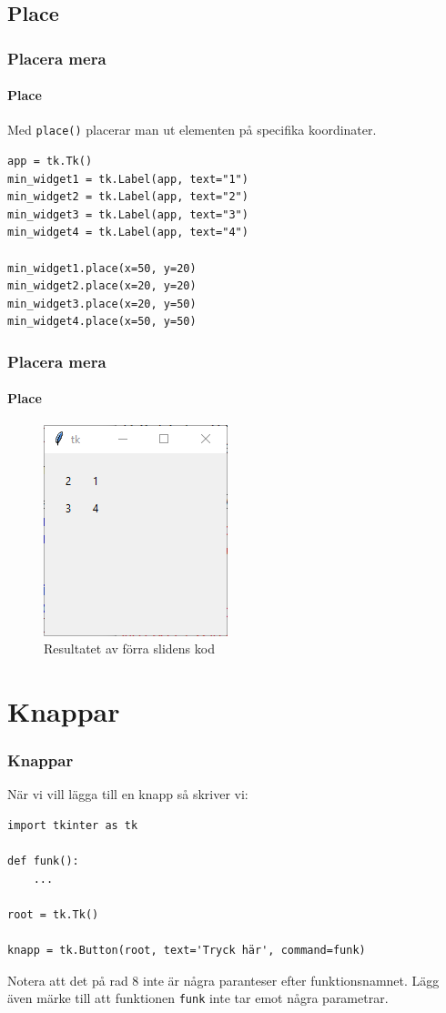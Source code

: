 \documentclass[aspectratio=169]{beamer}
\begin{document}
\subsection{Place}

\begin{frame}[fragile]
	\frametitle{Placera mera}
	\framesubtitle{Place}
	
	Med \lstinline{place()} placerar man ut elementen på specifika koordinater.
	
	\begin{lstlisting}
app = tk.Tk()
min_widget1 = tk.Label(app, text="1")
min_widget2 = tk.Label(app, text="2")
min_widget3 = tk.Label(app, text="3")
min_widget4 = tk.Label(app, text="4")

min_widget1.place(x=50, y=20)
min_widget2.place(x=20, y=20)
min_widget3.place(x=20, y=50)
min_widget4.place(x=50, y=50)
	\end{lstlisting}

\end{frame}

\begin{frame}
	\frametitle{Placera mera}
	\framesubtitle{Place}
	
	\begin{figure}
		\includegraphics{place-visa.png}
		\caption{Resultatet av förra slidens kod}
	\end{figure}
	
\end{frame}


\section{Knappar}

\begin{frame}[fragile]
	\frametitle{Knappar}
	
	När vi vill lägga till en knapp så skriver vi:
	
	\begin{lstlisting}
import tkinter as tk

def funk():
    ...

root = tk.Tk()

knapp = tk.Button(root, text='Tryck här', command=funk)
	\end{lstlisting}

	Notera att det på rad 8 inte är några paranteser efter funktionsnamnet. Lägg även märke till att funktionen \texttt{funk} inte tar emot några parametrar.

\end{frame}
\end{document}
